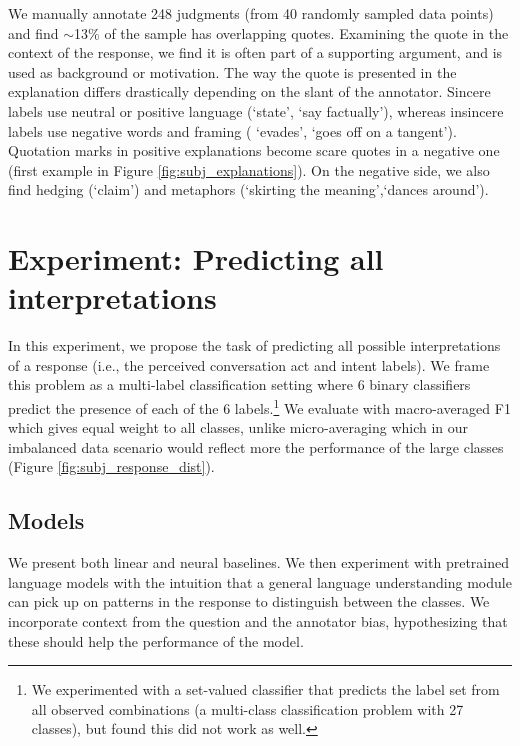 We manually annotate 248 judgments (from 40 randomly sampled data points) and find $\sim$13\% of the sample has overlapping quotes. Examining the quote in the context of the response, we find it is often part of a supporting argument, and is used as background or motivation. The way the quote is presented in the explanation differs drastically depending on the slant of the annotator. Sincere labels use neutral or positive language (`state', `say factually'), whereas insincere labels use negative words and framing ( `evades', `goes off on a tangent'). Quotation marks in positive explanations become scare quotes in a negative one (first example in Figure \ref{fig:subj_explanations}). On the negative side, we also find hedging (`claim') and metaphors (`skirting the meaning',`dances around').


\section{Experiment: Predicting all interpretations}
In this experiment, we propose the task of predicting all possible interpretations of a response (i.e., the perceived conversation act and intent labels). We frame this problem as a multi-label classification setting where 6 binary classifiers predict the presence of each of the 6 labels.\footnote{We experimented with a set-valued classifier that predicts the label set from all observed combinations (a multi-class classification problem with 27 classes), but found this did not work as well.} We evaluate with macro-averaged F1 which gives equal weight to all classes, unlike micro-averaging which in our imbalanced data scenario would reflect more the performance of the large classes (Figure \ref{fig:subj_response_dist}).

\subsection{Models}
We present both linear and neural baselines. We then experiment with pretrained language models with the intuition that a general language understanding module can pick up on patterns in the response to distinguish between the classes. We incorporate context from the question and the annotator bias, hypothesizing that these should help the performance of the model.

